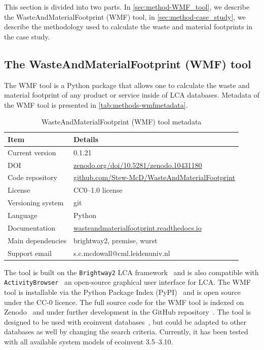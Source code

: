 This section is divided into two parts. In \autoref{sec:method-WMF_tool}, we describe the WasteAndMaterialFootprint (WMF) tool, in \autoref{sec:method-case_study}, we describe the methodology used to calculate the waste and material footprints in the case study.

\subsection{The WasteAndMaterialFootprint (WMF) tool}
\label{sec:method-WMF_tool}

The WMF tool is a Python package that allows one to calculate the waste and material footprint of any product or service inside of LCA databases. Metadata of the WMF tool is presented in \autoref{tab:methods-wmfmetadata}. 

\begin{table}[h]
    \caption{WasteAndMaterialFootprint (WMF) tool metadata}
    \label{tab:methods-wmfmetadata}
    \centering
    \begin{tabular}{ll}
    \toprule
    \textbf{Item} & \textbf{Details} \\
    \midrule
    Current version & 0.1.21 \\
    DOI & \url{zenodo.org/doi/10.5281/zenodo.10431180} \\
    Code repository & \url{github.com/Stew-McD/WasteAndMaterialFootprint} \\
    License & CC0--1.0 license \\
    Versioning system & git \\
    Language & Python \\
    Documentation & \url{wasteandmaterialfootprint.readthedocs.io} \\
    Main dependencies & brightway2, premise, wurst \\
    Support email & s.c.mcdowall@cml.leidenuniv.nl \\
    \bottomrule
    \end{tabular}
\end{table}
    
    
The tool is built on the \texttt{Brightway2} LCA framework~\citep{mutel2017brightway} and is also compatible with \texttt{ActivityBrowser}~\citep{steubing2020activitybrowser} an open-source graphical user interface for LCA. The WMF tool is installable via the Python Package Index (PyPI)~\citep{mcdowall2023wmfpipy} and is open source under the CC-0 licence. The full source code for the WMF tool is indexed on Zenodo~\citep{mcdowall2023wmfzenodo} and under further development in the GitHub repository~\citep{mcdowall2024wmfgithub}. The tool is designed to be used with ecoinvent databases~\citep{ecoinvent2016version3}, but could be adapted to other databases as well by changing the search criteria. Currently, it has been tested with all available system models of ecoinvent 3.5--3.10.

